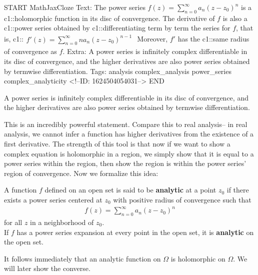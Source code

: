 \documentclass{memoir}
\begin{document}
\begin{anki}
START
MathJaxCloze
Text: The power series \(f(z) = \sum_{n=0}^{\infty} a_n (z-z_0)^n\) is a {{c1::holomorphic function}} in its disc of convergence. The derivative of \(f\) is also a {{c1::power series}} obtained by {{c1::differentiating term by term the series for \(f\)}}, that is,
 {{c1::\(\begin{align*}
        	f'(z) = \sum_{n=0}^{\infty} na_n(z-z_0)^{n-1}
        \end{align*}\)}} 
	Moreover, \(f'\) has the {{c1::same radius of convergence}} as \(f\).
Extra: A power series is infinitely complex differentiable in its disc of convergence, and the higher derivatives are also power series obtained by termwise differentiation.
Tags: analysis complex_analysis power_series complex_analyticity
<!--ID: 1624504054031-->
END
\end{anki}


\begin{cor}
	A power series is infinitely complex differentiable in its disc of convergence, and the higher derivatives are also power series obtained by termwise differentiation.
\end{cor}
This is an incredibly powerful statement. Compare this to real analysis-- in real analysis, we cannot infer a function has higher derivatives from the existence of a first derivative. The strength of this tool is that now if we want to show a complex equation is holomorphic in a region, we simply show that it is equal to a power series within the region, then show the region is within the power series' region of convergence. Now we formalize this idea:

\begin{defn}[Analytic]
	A function \(f\) defined on an open set is said to be \textbf{analytic} at a point \(z_0\) if there exists a power series centered at \(z_0\) with positive radius of convergence such that
	\begin{align*}
		f(z) = \sum_{n=0}^{\infty} a_n(z-z_0)^{n}
	\end{align*}
	for all \(z\) in a neighborhood of \(z_0\).\\

	If \(f\) has a power series expansion at every point in the open set, it is \textbf{analytic} on the open set.
\end{defn}
It follows immediately that an analytic function on \(\Omega \) is holomorphic on \(\Omega \). We will later show the converse.
\end{document}
